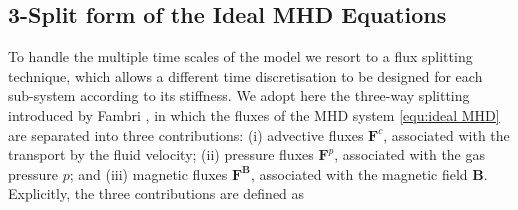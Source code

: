\documentclass[a4paper,fleqn]{cas-sc}
\theoremstyle{definition}
\theoremstyle{remark}
\begin{document}
\subsection{3-Split form of the Ideal MHD Equations}
\label{sec:3-split}
To handle the multiple time scales of the model we resort to a flux splitting technique,
which allows a different time discretisation to be designed for each sub-system
according to its stiffness. We adopt here the three-way splitting introduced by Fambri
\cite{Fambri2021}, in which the fluxes of the MHD system \eqref{equ:ideal MHD} are
separated into three contributions: (i) advective fluxes $\mathbf{F}^c$, associated
with the transport by the fluid velocity; (ii) pressure fluxes $\mathbf{F}^p$,
associated with the gas pressure $p$; and (iii) magnetic fluxes $\mathbf{F}^{\mathbf B}$,
associated with the magnetic field $\mathbf B$. Explicitly, the three contributions are
defined as
\end{document}
